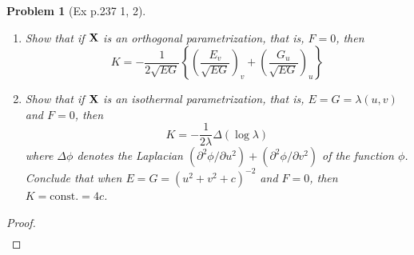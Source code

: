 \documentclass[10pt,a4paper]{article}
\newcounter{theProblemCounter}
\newtheorem{problem}[theProblemCounter]{Problem}
\begin{document}
\setcounter{theProblemCounter}{7}
\begin{problem}[Ex p.237 1, 2]
\begin{enumerate}
\item[(a)]
Show that if $\mathbf{X}$ is an orthogonal parametrization, that is, $F=0$, then
\[
K=-\frac{1}{2\sqrt{EG}}\left\{\left(\frac{E_v}{\sqrt{EG}}\right)_v+\left(\frac{G_u}{\sqrt{EG}}\right)_u\right\}
\]
\item[(b)]
Show that if $\mathbf{X}$ is an isothermal parametrization, that is, $E=G=\lambda(u,v)$ and $F=0$, then
\[
K=-\frac{1}{2\lambda}\Delta(\log\lambda)
\]
where $\Delta\phi$ denotes the Laplacian $(\partial^2\phi/\partial u^2)+(\partial^2\phi/\partial v^2)$ of the function $\phi$. Conclude that when $E=G=(u^2+v^2+c)^{-2}$ and $F=0$, then $K=\textrm{const}.=4c$.
\end{enumerate}

\end{problem}
\begin{proof}
\begin{align*}
\end{align*}
\end{proof}
\end{document}
